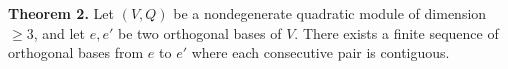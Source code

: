 \textbf{Theorem 2.} Let $(V,Q)$ be a nondegenerate quadratic module of dimension $\geq 3$, and let $e, e'$ be two orthogonal bases of $V$. There exists a finite sequence of orthogonal bases from $e$ to $e'$ where each consecutive pair is contiguous.
